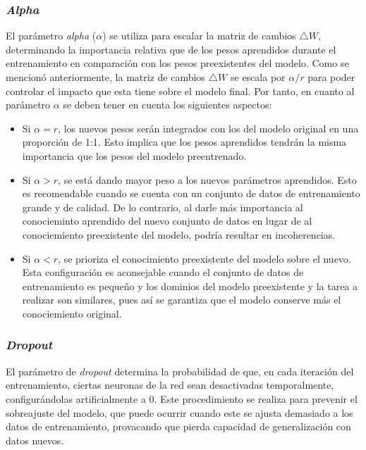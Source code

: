 \documentclass[11pt,spanish,listoffigures,listoftables]{tfgetsinf}
\begin{document}
\subsubsection{\textit{Alpha}}

El parámetro \textit{alpha} ($\alpha$) se utiliza para escalar la matriz de cambios $\bigtriangleup W$, determinando la importancia relativa que de los pesos aprendidos durante el entrenamiento en comparación con los pesos preexistentes del modelo. Como se mencionó anteriormente, la matriz de cambios $\bigtriangleup W$ se escala por $\alpha / r$ para poder controlar el impacto que esta tiene sobre el modelo final. Por tanto, en cuanto al parámetro $\alpha$ se deben tener en cuenta los siguientes aspectos:

\begin{itemize}
	\item Si $\alpha = r$, los nuevos pesos serán integrados con los del modelo original en una proporción de 1:1. Esto implica que los pesos aprendidos tendrán la misma importancia que los pesos del modelo preentrenado.
	\item Si $\alpha > r$, se está dando mayor peso a los nuevos parámetros aprendidos. Esto es recomendable  cuando se cuenta con un conjunto de datos de entrenamiento grande y de calidad. De lo contrario, al darle más importancia al conocieminto aprendido del nuevo conjunto de datos en lugar de al conociemiento preexistente del modelo, podría resultar en incoherencias.
	\item Si $\alpha < r$, se prioriza el conocimiento preexistente del modelo sobre el nuevo. Esta configuración es aconsejable cuando el conjunto de datos de entrenamiento es pequeño y los dominios del modelo preexistente y la tarea a realizar son similares, pues así se garantiza que el modelo conserve más el conociemiento original.
\end{itemize}

\subsubsection{\textit{Dropout}}

El parámetro de \textit{dropout} determina la probabilidad de que, en cada iteración del entrenamiento, ciertas neuronas de la red sean desactivadas temporalmente, configurándolas artificialmente a 0. Este procedimiento se realiza para prevenir el sobreajuste del modelo, que puede ocurrir cuando este se ajusta demasiado a los datos de entrenamiento, provacando que pierda capacidad de generalización con datos nuevos.
\end{document}
